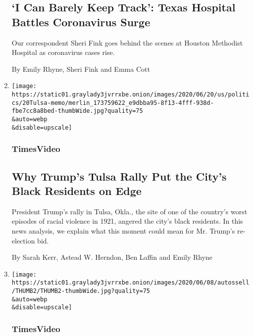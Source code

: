 \begin{enumerate}
  \hypertarget{i-can-barely-keep-track-texas-hospital-battles-coronavirus-surge}{%
  \subsection{`I Can Barely Keep Track': Texas Hospital Battles
  Coronavirus
  Surge}\label{i-can-barely-keep-track-texas-hospital-battles-coronavirus-surge}}

  Our correspondent Sheri Fink goes behind the scenes at Houston
  Methodist Hospital as coronavirus cases rise.

  By Emily Rhyne, Sheri Fink and Emma Cott
\item
  \href{/video/us/100000007188759/trump-rally-juneteenth-tulsa-oklahoma.html}{}

  \texttt{[image: https://static01.graylady3jvrrxbe.onion/images/2020/06/20/us/politics/20Tulsa-memo/merlin\_173759622\_e9dbba95-8f13-4fff-938d-fbe7cc8a8bed-thumbWide.jpg?quality=75\\\&auto=webp\\\&disable=upscale]}

  \hypertarget{timesvideo-2}{%
  \subsubsection{TimesVideo}\label{timesvideo-2}}

  \hypertarget{why-trumps-tulsa-rally-put-the-citys-black-residents-on-edge}{%
  \subsection{Why Trump's Tulsa Rally Put the City's Black Residents on
  Edge}\label{why-trumps-tulsa-rally-put-the-citys-black-residents-on-edge}}

  President Trump's rally in Tulsa, Okla., the site of one of the
  country's worst episodes of racial violence in 1921, angered the
  city's black residents. In this news analysis, we explain what this
  moment could mean for Mr. Trump's re-election bid.

  By Sarah Kerr, Astead W. Herndon, Ben Laffin and Emily Rhyne
\item
  \href{/video/us/100000007177799/washington-dc-protests-white-house.html}{}

  \texttt{[image: https://static01.graylady3jvrrxbe.onion/images/2020/06/08/autossell/THUMB2/THUMB2-thumbWide.jpg?quality=75\\\&auto=webp\\\&disable=upscale]}

  \hypertarget{timesvideo-3}{%
  \subsubsection{TimesVideo}\label{timesvideo-3}}


\end{enumerate}
